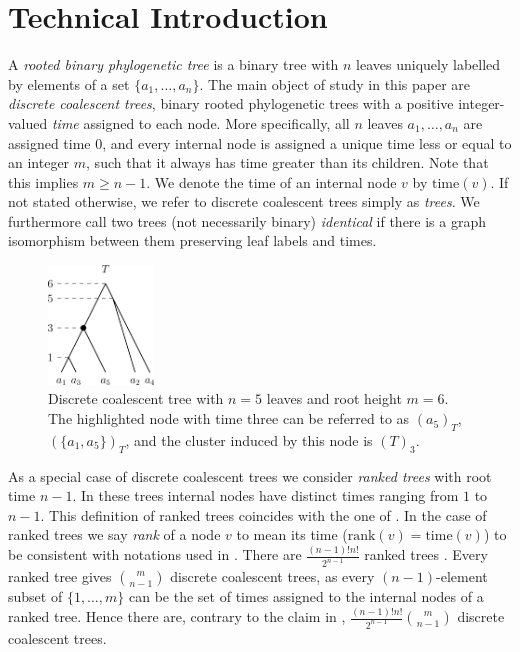 \documentclass[11pt]{amsart}
\newcommand{\rank}{\mathrm{rank}}
\newcommand{\ntime}{\mathrm{time}}
\newcommand{\summary}[1]{} %
\begin{document}
\section{Technical Introduction}
\label{section:technical_introduction}

\summary{Introducing discrete coalescent trees and ranked trees}
A \emph{rooted binary phylogenetic tree} is a binary tree with $n$ leaves uniquely labelled by elements of a set $\{a_1, \ldots, a_n\}$.
The main object of study in this paper are \emph{discrete coalescent trees}, binary rooted phylogenetic trees with a positive integer-valued \emph{time} assigned to each node.
More specifically, all $n$ leaves $a_1, \ldots, a_n$ are assigned time $0$, and every internal node is assigned a unique time less or equal to an integer $m$, such that it always has time greater than its children.
Note that this implies $m \geq n-1$.
We denote the time of an internal node $v$ by $\ntime(v)$.
If not stated otherwise, we refer to discrete coalescent trees simply as \emph{trees}.
We furthermore call two trees (not necessarily binary) \emph{identical} if there is a graph isomorphism between them preserving leaf labels and times.

\begin{figure}[ht]
	\includegraphics[width=0.25\textwidth]{dtt_tree.eps}
	\caption{Discrete coalescent tree with $n = 5$ leaves and root height $m = 6$.
	The highlighted node with time three can be referred to as $(a_5)_T$, $(\{a_1,a_5\})_T$, and the cluster induced by this node is $(T)_3$.}
	\label{fig:dtt_tree}
\end{figure}

As a special case of discrete coalescent trees we consider \emph{ranked trees} with root time $n-1$.
In these trees internal nodes have distinct times ranging from $1$ to $n-1$.
This definition of ranked trees coincides with the one of \textcite{Collienne2020-iu}.
In the case of ranked trees we say \emph{rank} of a node $v$ to mean its time ($\rank(v) = \ntime(v)$) to be consistent with notations used in \autocite{Collienne2020-iu}.
There are $\frac{(n-1)!n!}{2^{n-1}}$ ranked trees \autocite{Semple2003-nj}.
Every ranked tree gives ${m \choose n-1}$ discrete coalescent trees, as every $(n-1)$-element subset of $\{1, \ldots, m\}$ can be the set of times assigned to the internal nodes of a ranked tree.
Hence there are, contrary to the claim in \autocite{Gavryushkin2018-ol}, $\frac{(n-1)!n!}{2^{n-1}} {m \choose n-1}$ discrete coalescent trees.
\end{document}
